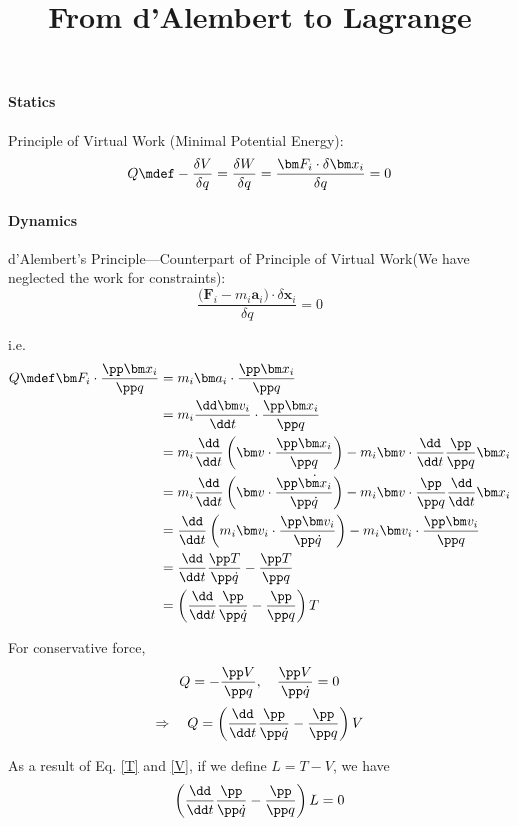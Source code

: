 \documentclass[12pt]{article}
\title{From d'Alembert to Lagrange}
\author{\zpj}
\begin{document}
\maketitle
\paragraph{Statics}
Principle of Virtual Work (Minimal Potential Energy):
\[Q\mdef-\frac{\delta V}{\delta q}=\frac{\delta W}{\delta q}=\frac{\bm F_i\cdot\delta \bm x_i}{\delta q}=0\]

\paragraph{Dynamics}

d'Alembert's Principle---Counterpart of Principle of Virtual Work(We have neglected the work for constraints):
\[\frac{\bm (\bm F_i-m_i\bm a_i)\cdot\delta \bm x_i}{\delta q}=0\]

i.e. 
\begin{align}
Q\mdef\bm F_i\cdot\frac{\pp \bm x_i}{\pp q}&=m_i\bm a_i\cdot\frac{\pp \bm x_i}{\pp q}\\
&=m_i\frac{\dd \bm v_i}{\dd t}\cdot\frac{\pp \bm x_i}{\pp q}\\
&=m_i\frac{\dd}{\dd t}\left( \bm v\cdot\frac{\pp \bm x_i}{\pp q}\right)-m_i\bm v\cdot\frac{\dd}{\dd t}\frac{\pp}{\pp q}\bm x_i\\
&=m_i\frac{\dd}{\dd t}\left(\bm v\cdot\frac{\pp \dot{\bm x_i}}{\pp\dot q}\right)-m_i\bm v\cdot\frac{\pp}{\pp q}\frac{\dd}{\dd t}\bm x_i\\
&=\frac{\dd}{\dd t}\left(m_i\bm v_i\cdot\frac{\pp\bm v_i}{\pp\dot q}\right)-m_i\bm v_i\cdot\frac{\pp \bm v_i}{\pp q}\\
&=\frac{\dd}{\dd t}\frac{\pp T}{\pp\dot q}-\frac{\pp T}{\pp q}\\
&=\left(\frac{\dd}{\dd t}\frac{\pp}{\pp\dot q}-\frac{\pp}{\pp q}\right)T\label{T}
\end{align}

For conservative force,
\[Q=-\frac{\pp V}{\pp q},\quad \frac{\pp V}{\pp \dot q}=0\]
\begin{equation}
\Rightarrow\quad Q=\left(\frac{\dd}{\dd t}\frac{\pp}{\pp\dot q}-\frac{\pp}{\pp q}\right)V\label{V}
\end{equation}

As a result of Eq. \ref{T} and \ref{V}, if we define $L=T-V$, we have
\[\left(\frac{\dd}{\dd t}\frac{\pp}{\pp\dot q}-\frac{\pp}{\pp q}\right)L=0\]
\end{document}
